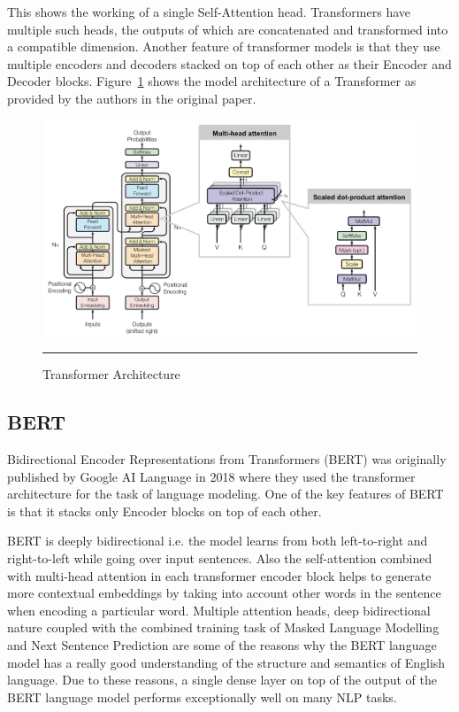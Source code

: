 This shows the working of a single Self-Attention head. Transformers have multiple such heads, the outputs of which are concatenated and transformed into a compatible dimension. Another feature of transformer models is that they use multiple encoders and decoders stacked on top of each other as their Encoder and Decoder blocks. 
Figure~\ref{fig:vaswani_transformer} shows the model architecture of a Transformer as provided by the authors in the original paper.
\begin{figure}[htbp]
  \centering
    \includegraphics[scale=0.18]{Figures/vaswani_transformer.jpg}
    \rule{35em}{0.5pt}
  \caption[Transformer Architecture]{Transformer Architecture}
  \label{fig:vaswani_transformer}
\end{figure}

\clearpage
\subsection{BERT}

Bidirectional Encoder Representations from Transformers (BERT) was originally published by Google AI Language in 2018 where they used the transformer architecture for the task of language modeling\cite{devlin-etal-2019-bert}. One of the key features of BERT is that it stacks only Encoder blocks on top of each other.

BERT is deeply bidirectional i.e. the model learns from both left-to-right and right-to-left while going over input sentences. Also the self-attention combined with multi-head attention in each transformer encoder block helps to generate more contextual embeddings by taking into account other words in the sentence when encoding a particular word. Multiple attention heads, deep bidirectional nature coupled with the combined training task of Masked Language Modelling and Next Sentence Prediction are some of the reasons why the BERT language model has a really good understanding of the structure and semantics of English language. Due to these reasons, a single dense layer on top of the output of the BERT language model performs exceptionally well on many NLP tasks.


